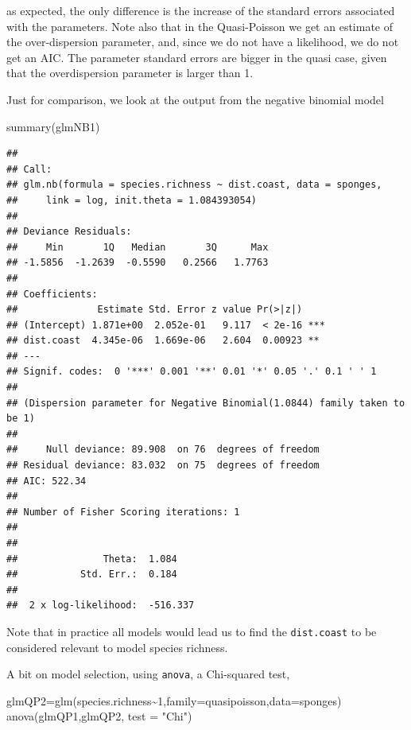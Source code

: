 \documentclass[
]{book}
\newenvironment{Shaded}{\begin{snugshade}}{\end{snugshade}}
\newcommand{\AttributeTok}[1]{\textcolor[rgb]{0.77,0.63,0.00}{#1}}
\newcommand{\DecValTok}[1]{\textcolor[rgb]{0.00,0.00,0.81}{#1}}
\newcommand{\FunctionTok}[1]{\textcolor[rgb]{0.00,0.00,0.00}{#1}}
\newcommand{\NormalTok}[1]{#1}
\newcommand{\OtherTok}[1]{\textcolor[rgb]{0.56,0.35,0.01}{#1}}
\newcommand{\SpecialCharTok}[1]{\textcolor[rgb]{0.00,0.00,0.00}{#1}}
\newcommand{\StringTok}[1]{\textcolor[rgb]{0.31,0.60,0.02}{#1}}
\begin{document}
as expected, the only difference is the increase of the standard errors associated with the parameters. Note also that in the Quasi-Poisson we get an estimate of the over-dispersion parameter, and, since we do not have a likelihood, we do not get an AIC. The parameter standard errors are bigger in the quasi case, given that the overdispersion parameter is larger than 1.

Just for comparison, we look at the output from the negative binomial model

\begin{Shaded}
\begin{Highlighting}[]
\FunctionTok{summary}\NormalTok{(glmNB1)}
\end{Highlighting}
\end{Shaded}

\begin{verbatim}
## 
## Call:
## glm.nb(formula = species.richness ~ dist.coast, data = sponges, 
##     link = log, init.theta = 1.084393054)
## 
## Deviance Residuals: 
##     Min       1Q   Median       3Q      Max  
## -1.5856  -1.2639  -0.5590   0.2566   1.7763  
## 
## Coefficients:
##              Estimate Std. Error z value Pr(>|z|)    
## (Intercept) 1.871e+00  2.052e-01   9.117  < 2e-16 ***
## dist.coast  4.345e-06  1.669e-06   2.604  0.00923 ** 
## ---
## Signif. codes:  0 '***' 0.001 '**' 0.01 '*' 0.05 '.' 0.1 ' ' 1
## 
## (Dispersion parameter for Negative Binomial(1.0844) family taken to be 1)
## 
##     Null deviance: 89.908  on 76  degrees of freedom
## Residual deviance: 83.032  on 75  degrees of freedom
## AIC: 522.34
## 
## Number of Fisher Scoring iterations: 1
## 
## 
##               Theta:  1.084 
##           Std. Err.:  0.184 
## 
##  2 x log-likelihood:  -516.337
\end{verbatim}

Note that in practice all models would lead us to find the \texttt{dist.coast} to be considered relevant to model species richness.

A bit on model selection, using \texttt{anova}, a Chi-squared test,

\begin{Shaded}
\begin{Highlighting}[]
\NormalTok{glmQP2}\OtherTok{=}\FunctionTok{glm}\NormalTok{(species.richness}\SpecialCharTok{\textasciitilde{}}\DecValTok{1}\NormalTok{,}\AttributeTok{family=}\NormalTok{quasipoisson,}\AttributeTok{data=}\NormalTok{sponges)}
\FunctionTok{anova}\NormalTok{(glmQP1,glmQP2, }\AttributeTok{test =} \StringTok{"Chi"}\NormalTok{)}
\end{Highlighting}
\end{Shaded}
\end{document}
